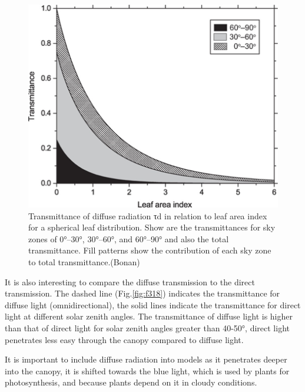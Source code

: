 \documentclass[12pt,oneside]{book}
\begin{document}
\begin{figure}

{\centering \includegraphics[width=0.8\linewidth]{figures/chap3/f317_diff_trans} 

}

\caption{Transmittance of diffuse radiation τd in relation to leaf area index for a spherical leaf distribution. Show are the transmittances for sky zones of 0°–30°, 30°–60°, and 60°–90° and also the total transmittance. Fill patterns show the contribution of each sky zone to total transmittance.(Bonan)}\label{fig:f317}
\end{figure}

It is also interesting to compare the diffuse transmission to the direct
transmission. The dashed line (Fig.\ref{fig:f318}) indicates the
transmittance for diffuse light (omnidirectional), the solid lines
indicate the transmittance for direct light at different solar zenith
angles. The transmittance of diffuse light is higher than that of direct
light for solar zenith angles greater than 40-50°, direct light
penetrates less easy through the canopy compared to diffuse light.

It is important to include diffuse radiation into models as it
penetrates deeper into the canopy, it is shifted towards the blue light,
which is used by plants for photosynthesis, and because plants depend on
it in cloudy conditions.
\end{document}
